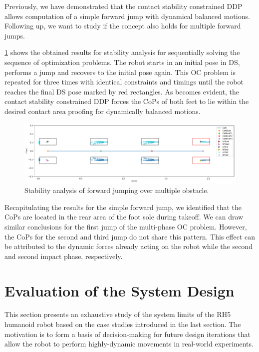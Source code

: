 Previously, we have demonstrated that the contact stability constrained \gls{DDP} allows computation of a simple forward jump with dynamical balanced motions. Following up, we want to study if the concept also holds for multiple forward jumps. 

\cref{fig:jumpObstacles_StabilityAnalysis} shows the obtained results for stability analysis for sequentially solving the sequence of optimization problems. The robot starts in an initial pose in \gls{DS}, performs a jump and recovers to the initial pose again. This \gls{OC} problem is repeated for three times with identical constraints and timings until the robot reaches the final \gls{DS} pose marked by red rectangles. As becomes evident, the contact stability constrained \gls{DDP} forces the \gls{CoP}s of both feet to lie within the desired contact area proofing for dynamically balanced motions. 

\begin{figure}[h!]
\centering	
\includegraphics[width=1\textwidth]{fig/jumpObstacles/StabilityAnalysis}
\caption{Stability analysis of forward jumping over multiple obstacle.}
\label{fig:jumpObstacles_StabilityAnalysis}
\end{figure}

Recapitulating the results for the simple forward jump, we identified that the \gls{CoP}s are located in the rear area of the foot sole during takeoff. We can draw similar conclusions for the first jump of the multi-phase \gls{OC} problem. However, the \gls{CoP}s for the second and third jump do not share this pattern. This effect can be attributed to the dynamic forces already acting on the robot while the second and second impact phase, respectively.


\section{Evaluation of the System Design}\label{sec:HighlyIdentification}

This section presents an exhaustive study of the system limits of the RH5 humanoid robot based on the case studies introduced in the last section. The motivation is to form a basis of decision-making for future design iterations that allow the robot to perform highly-dynamic movements in real-world experiments.

